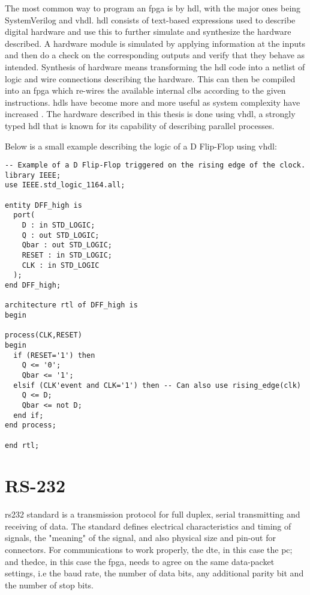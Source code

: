 \documentclass[main.tex]{subfiles}
\begin{document}
The most common way to program an \gls{fpga} is by \gls{hdl}, with the major ones being SystemVerilog and \acrshort{vhdl}. \Gls{hdl} consists of text-based expressions used to describe digital hardware and use this to further simulate and synthesize the hardware described. A hardware module is simulated by applying information at the inputs and then do a check on the corresponding outputs and verify that they behave as intended. Synthesis of hardware means transforming the \gls{hdl} code into a netlist of logic and wire connections describing the hardware. This can then be compiled into an \gls{fpga} which re-wires the available internal \glspl{clb} according to the given instructions. \glspl{hdl} have become more and more useful as system complexity have increased \cite{weste11}. The hardware described in this thesis is done using \acrshort{vhdl}, a strongly typed \gls{hdl} that is known for its capability of describing parallel processes.

Below is a small example describing the logic of a D Flip-Flop using \acrshort{vhdl}:


\begin{lstlisting}[frame=single] 
-- Example of a D Flip-Flop triggered on the rising edge of the clock.
library IEEE; 
use IEEE.std_logic_1164.all; 
 
entity DFF_high is 
  port( 
    D : in STD_LOGIC; 
    Q : out STD_LOGIC; 
    Qbar : out STD_LOGIC; 
    RESET : in STD_LOGIC; 
    CLK : in STD_LOGIC 
  ); 
end DFF_high; 
 
architecture rtl of DFF_high is 
begin 
 
process(CLK,RESET) 
begin 
  if (RESET='1') then 
    Q <= '0'; 
    Qbar <= '1'; 
  elsif (CLK'event and CLK='1') then -- Can also use rising_edge(clk)
    Q <= D; 
    Qbar <= not D; 
  end if; 
end process;
  
end rtl; 
\end{lstlisting}


\section{RS-232} \label{ap:rs232}

\acrshort{rs232} standard is a transmission protocol for full duplex, serial transmitting and receiving of data. The standard defines electrical characteristics and timing of signals, the "meaning" of the signal, and also physical size and pin-out for connectors.
For communications to work properly, the \gls{dte}, in this case the \acrshort{pc}; and the\gls{dce}, in this case the \gls{fpga}, needs to agree on the same data-packet settings, i.e the baud rate, the number of data bits, any additional parity bit and the number of stop bits.\\
\end{document}
